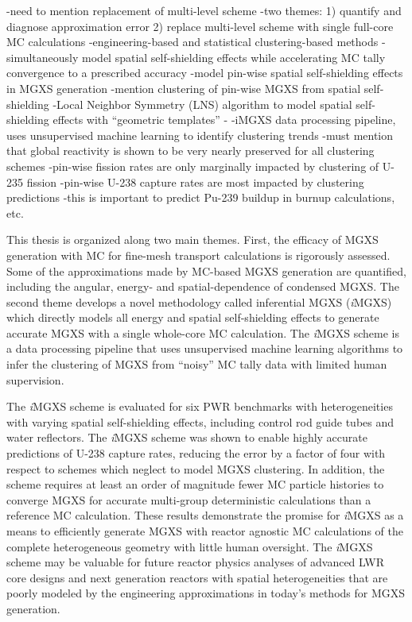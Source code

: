 \begin{abstractpage}

-need to mention replacement of multi-level scheme
-two themes:
1) quantify and diagnose approximation error
2) replace multi-level scheme with single full-core MC calculations
    -engineering-based and statistical clustering-based methods
      -simultaneously model spatial self-shielding effects while accelerating MC tally convergence to a prescribed accuracy 
    -model pin-wise spatial self-shielding effects in MGXS generation
      -mention clustering of pin-wise MGXS from spatial self-shielding
      -Local Neighbor Symmetry (LNS) algorithm to model spatial self-shielding effects with ``geometric templates''
      -
    -iMGXS data processing pipeline, uses unsupervised machine learning to identify clustering trends
  -must mention that global reactivity is shown to be very nearly preserved for all clustering schemes 
  -pin-wise fission rates are only marginally impacted by clustering of U-235 fission
  -pin-wise U-238 capture rates are most impacted by clustering predictions
    -this is important to predict Pu-239 buildup in burnup calculations, etc.

This thesis is organized along two main themes. First, the efficacy of MGXS generation with MC for fine-mesh transport calculations is rigorously assessed. Some of the approximations made by MC-based MGXS generation are quantified, including the angular, energy- and spatial-dependence of condensed MGXS. The second theme develops a novel methodology called inferential MGXS (\textit{i}MGXS) which directly models all energy and spatial self-shielding effects to generate accurate MGXS with a single whole-core MC calculation. The \textit{i}MGXS scheme is a data processing pipeline that uses unsupervised machine learning algorithms to infer the clustering of MGXS from ``noisy'' MC tally data with limited human supervision.

The \textit{i}MGXS scheme is evaluated for six PWR benchmarks with heterogeneities with varying spatial self-shielding effects, including control rod guide tubes and water reflectors. The \textit{i}MGXS scheme was shown to enable highly accurate predictions of U-238 capture rates, reducing the error by a factor of four with respect to schemes which neglect to model MGXS clustering. In addition, the scheme requires at least an order of magnitude fewer MC particle histories to converge MGXS for accurate multi-group deterministic calculations than a reference MC calculation. These results demonstrate the promise for \textit{i}MGXS as a means to efficiently generate MGXS with reactor agnostic MC calculations of the complete heterogeneous geometry with little human oversight. The \textit{i}MGXS scheme may be valuable for future reactor physics analyses of advanced LWR core designs and next generation reactors with spatial heterogeneities that are poorly modeled by the engineering approximations in today's methods for MGXS generation.


\end{abstractpage}
